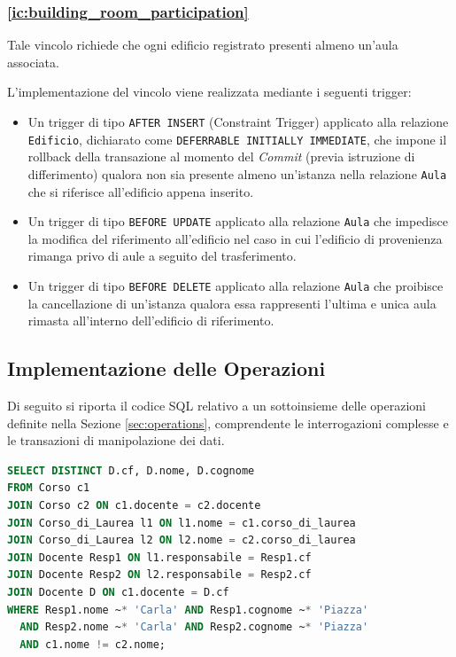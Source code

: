 \documentclass[a4paper,11pt]{article}
\begin{document}
\subsubsection{\ref{ic:building_room_participation}}

Tale vincolo richiede che ogni edificio registrato presenti almeno un'aula associata.

L'implementazione del vincolo viene realizzata mediante i seguenti trigger:
\begin{itemize}
    \item Un trigger di tipo \texttt{AFTER INSERT} (Constraint Trigger) applicato alla relazione \texttt{Edificio}, dichiarato come \texttt{DEFERRABLE INITIALLY IMMEDIATE}, che impone il rollback della transazione al momento del \textit{Commit} (previa istruzione di differimento) qualora non sia presente almeno un'istanza nella relazione \texttt{Aula} che si riferisce all'edificio appena inserito.
    \item Un trigger di tipo \texttt{BEFORE UPDATE} applicato alla relazione \texttt{Aula} che impedisce la modifica del riferimento all'edificio nel caso in cui l'edificio di provenienza rimanga privo di aule a seguito del trasferimento.
    \item Un trigger di tipo \texttt{BEFORE DELETE} applicato alla relazione \texttt{Aula} che proibisce la cancellazione di un'istanza qualora essa rappresenti l'ultima e unica aula rimasta all'interno dell'edificio di riferimento.
\end{itemize}

\subsection{Implementazione delle Operazioni}

Di seguito si riporta il codice SQL relativo a un sottoinsieme delle operazioni definite nella Sezione \ref{sec:operations}, comprendente le interrogazioni complesse e le transazioni di manipolazione dei dati.

\begin{lstlisting}[language=SQL, title={\ref{op:find_teachers_by_responsible}: Individuare i docenti per il responsabile Carla Piazza}]
SELECT DISTINCT D.cf, D.nome, D.cognome
FROM Corso c1
JOIN Corso c2 ON c1.docente = c2.docente
JOIN Corso_di_Laurea l1 ON l1.nome = c1.corso_di_laurea
JOIN Corso_di_Laurea l2 ON l2.nome = c2.corso_di_laurea
JOIN Docente Resp1 ON l1.responsabile = Resp1.cf
JOIN Docente Resp2 ON l2.responsabile = Resp2.cf
JOIN Docente D ON c1.docente = D.cf
WHERE Resp1.nome ~* 'Carla' AND Resp1.cognome ~* 'Piazza'
  AND Resp2.nome ~* 'Carla' AND Resp2.cognome ~* 'Piazza'
  AND c1.nome != c2.nome;
\end{lstlisting}
\end{document}
